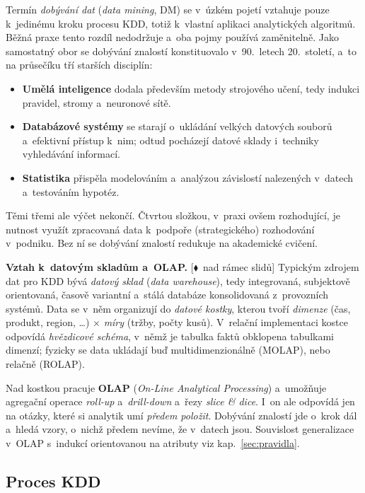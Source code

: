 \documentclass[11pt,a4paper]{article}
\theoremstyle{definition}
\newcommand{\mimo}{\textcolor{markcol}{\textsf{\footnotesize[$\blacklozenge$~nad rámec slidů]}}}
\begin{document}
Termín \emph{dobývání dat} (\emph{data mining}, DM) se v~úzkém pojetí vztahuje pouze
k~jedinému kroku procesu KDD, totiž k~vlastní aplikaci analytických algoritmů. Běžná praxe
tento rozdíl nedodržuje a~oba pojmy používá zaměnitelně. Jako samostatný obor se dobývání
znalostí konstituovalo v~90.~letech 20.~století, a~to na průsečíku tří starších disciplín:

\begin{itemize}
\item \textbf{Umělá inteligence} dodala především metody strojového učení, tedy indukci
      pravidel, stromy a~neuronové sítě.
\item \textbf{Databázové systémy} se starají o~ukládání velkých datových souborů
      a~efektivní přístup k~nim; odtud pocházejí datové sklady i~techniky vyhledávání
      informací.
\item \textbf{Statistika} přispěla modelováním a~analýzou závislostí nalezených v~datech
      a~testováním hypotéz.
\end{itemize}

Těmi třemi ale výčet nekončí. Čtvrtou složkou, v~praxi ovšem rozhodující, je nutnost
využít zpracovaná data k~podpoře (strategického) rozhodování v~podniku. Bez ní se dobývání
znalostí redukuje na akademické cvičení.

\textbf{Vztah k~datovým skladům a~OLAP.} \mimo{} Typickým zdrojem dat pro KDD bývá
\emph{datový sklad} (\emph{data warehouse}), tedy integrovaná, subjektově orientovaná,
časově variantní a~stálá databáze konsolidovaná z~provozních systémů. Data se v~něm
organizují do \emph{datové kostky}, kterou tvoří \emph{dimenze} (čas, produkt, region,
\dots) $\times$ \emph{míry} (tržby, počty kusů). V~relační implementaci kostce odpovídá
\emph{hvězdicové schéma}, v~němž je tabulka faktů obklopena tabulkami dimenzí; fyzicky se
data ukládají buď multidimenzionálně (MOLAP), nebo relačně (ROLAP).

Nad kostkou pracuje \textbf{OLAP} (\emph{On-Line Analytical Processing}) a~umožňuje
agregační operace \emph{roll-up} a~\emph{drill-down} a~řezy \emph{slice \& dice}. I~on ale
odpovídá jen na otázky, které si analytik umí \emph{předem položit}. Dobývání znalostí jde
o~krok dál a~hledá vzory, o~nichž předem nevíme, že v~datech jsou. Souvislost generalizace
v~OLAP s~indukcí orientovanou na atributy viz kap.~\ref{sec:pravidla}.

\subsection{Proces KDD}
\end{document}
